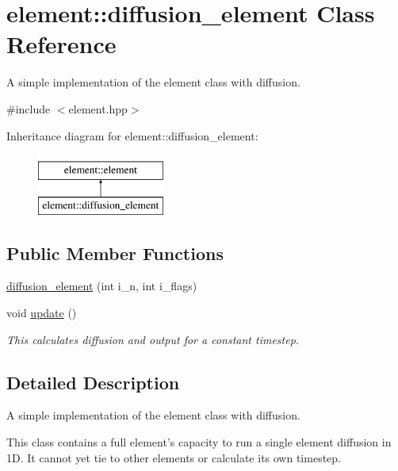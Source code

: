 \hypertarget{classelement_1_1diffusion__element}{\section{element\-:\-:diffusion\-\_\-element Class Reference}
\label{classelement_1_1diffusion__element}
}


A simple implementation of the element class with diffusion.  




{\ttfamily \#include $<$element.\-hpp$>$}

Inheritance diagram for element\-:\-:diffusion\-\_\-element\-:\begin{figure}[H]
\begin{center}
\leavevmode
\includegraphics[height=2.000000cm]{classelement_1_1diffusion__element}
\end{center}
\end{figure}
\subsection*{Public Member Functions}
\begin{DoxyCompactItemize}
\item 
\hyperlink{classelement_1_1diffusion__element_a93a857480b341ec48356db407c08feea}{diffusion\-\_\-element} (int i\-\_\-n, int i\-\_\-flags)
\item 
void \hyperlink{classelement_1_1diffusion__element_af14afe9aa8d5e374201c305ad2de3d3c}{update} ()
\begin{DoxyCompactList}\small\item\em This calculates diffusion and output for a constant timestep. \end{DoxyCompactList}\end{DoxyCompactItemize}


\subsection{Detailed Description}
A simple implementation of the element class with diffusion. 



 This class contains a full element's capacity to run a single element diffusion in 1\-D. It cannot yet tie to other elements or calculate its own timestep. 

